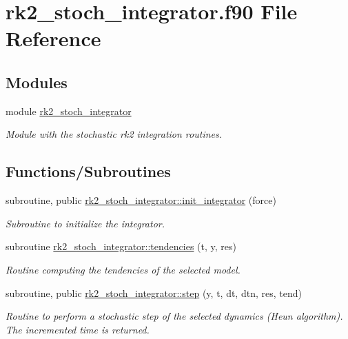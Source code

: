 \hypertarget{rk2__stoch__integrator_8f90}{}\section{rk2\+\_\+stoch\+\_\+integrator.\+f90 File Reference}
\label{rk2__stoch__integrator_8f90}
\subsection*{Modules}
\begin{DoxyCompactItemize}
\item 
module \hyperlink{namespacerk2__stoch__integrator}{rk2\+\_\+stoch\+\_\+integrator}
\begin{DoxyCompactList}\small\item\em Module with the stochastic rk2 integration routines. \end{DoxyCompactList}\end{DoxyCompactItemize}
\subsection*{Functions/\+Subroutines}
\begin{DoxyCompactItemize}
\item 
subroutine, public \hyperlink{namespacerk2__stoch__integrator_af2aad21166864b46801d558106e865f5}{rk2\+\_\+stoch\+\_\+integrator\+::init\+\_\+integrator} (force)
\begin{DoxyCompactList}\small\item\em Subroutine to initialize the integrator. \end{DoxyCompactList}\item 
subroutine \hyperlink{namespacerk2__stoch__integrator_ab4478053676fb4c82516b6427ecbdb35}{rk2\+\_\+stoch\+\_\+integrator\+::tendencies} (t, y, res)
\begin{DoxyCompactList}\small\item\em Routine computing the tendencies of the selected model. \end{DoxyCompactList}\item 
subroutine, public \hyperlink{namespacerk2__stoch__integrator_a6c9446aa0badd0e16d3762e762d330d5}{rk2\+\_\+stoch\+\_\+integrator\+::step} (y, t, dt, dtn, res, tend)
\begin{DoxyCompactList}\small\item\em Routine to perform a stochastic step of the selected dynamics (Heun algorithm). The incremented time is returned. \end{DoxyCompactList}\end{DoxyCompactItemize}

